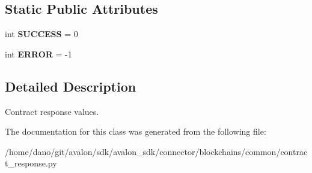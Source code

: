 \subsection*{Static Public Attributes}
\begin{DoxyCompactItemize}
\item 
\mbox{\label{classavalon__sdk_1_1connector_1_1blockchains_1_1common_1_1contract__response_1_1ContractResponse_a97daa9cd7c2343db04c95faa99109815}} 
int {\bfseries S\+U\+C\+C\+E\+SS} = 0
\item 
\mbox{\label{classavalon__sdk_1_1connector_1_1blockchains_1_1common_1_1contract__response_1_1ContractResponse_ab6808e946aaa63125853b0b55b3aabc5}} 
int {\bfseries E\+R\+R\+OR} = -\/1
\end{DoxyCompactItemize}


\subsection{Detailed Description}
\begin{DoxyVerb}Contract response values.\end{DoxyVerb}
 

The documentation for this class was generated from the following file\+:\begin{DoxyCompactItemize}
\item 
/home/dano/git/avalon/sdk/avalon\+\_\+sdk/connector/blockchains/common/contract\+\_\+response.\+py\end{DoxyCompactItemize}
